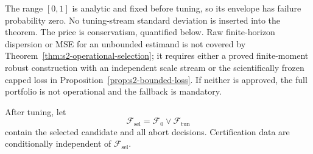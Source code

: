 \begin{remark}
\label{rem:s2-operational}
The range \([0,1]\) is analytic and fixed before tuning, so its envelope has
failure probability zero.  No tuning-stream standard deviation is inserted
into the theorem.  The price is conservatism, quantified below.  Raw
finite-horizon dispersion or MSE for an unbounded estimand is not covered by
Theorem~\ref{thm:s2-operational-selection}; it requires either a proved
finite-moment robust construction with an independent scale stream or the
scientifically frozen capped loss in
Proposition~\ref{prop:s2-bounded-loss}.  If neither is approved, the full
portfolio is not operational and the fallback is mandatory.
\end{remark}

After tuning, let
\[
 \mathcal F_{\mathrm{sel}}
 =
 \mathcal F_0\vee\mathcal F_{\mathrm{tun}}
\]
contain the selected candidate and all abort decisions.  Certification data
are conditionally independent of \(\mathcal F_{\mathrm{sel}}\).

